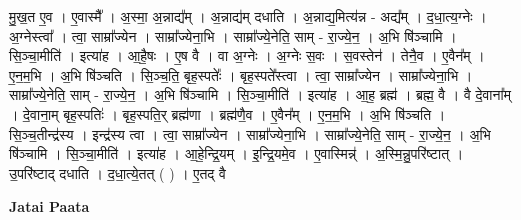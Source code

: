\documentclass[17pt]{extarticle}
\begin{document}
मु॒ख॒त ए॒व । ए॒वास्मै᳚ । अ॒स्मा॒ अ॒न्नाद्य᳚म् । अ॒न्नाद्य॑म् दधाति । अ॒न्नाद्य॒मित्य॑न्न - अद्य᳚म् । द॒धा॒त्य॒ग्नेः । अ॒ग्नेस्त्वा᳚ । त्वा॒ साम्रा᳚ज्येन । साम्रा᳚ज्येना॒भि । साम्रा᳚ज्ये॒नेति॒ साम् - रा॒ज्ये॒न॒ । अ॒भि षि॑ञ्चामि । सि॒ञ्चा॒मीति॑ । इत्या॑ह । आ॒है॒षः । ए॒ष वै । वा अ॒ग्नेः । अ॒ग्नेः स॒वः । स॒वस्तेन॑ । तेनै॒व । ए॒वैन᳚म् । ए॒न॒म॒भि । अ॒भि षि॑ञ्चति । सि॒ञ्च॒ति॒ बृह॒स्पतेः᳚ । बृह॒स्पते᳚स्त्वा । त्वा॒ साम्रा᳚ज्येन । साम्रा᳚ज्येना॒भि । साम्रा᳚ज्ये॒नेति॒ साम् - रा॒ज्ये॒न॒ । अ॒भि षि॑ञ्चामि । सि॒ञ्चा॒मीति॑ । इत्या॑ह । आ॒ह॒ ब्रह्म॑ । ब्रह्म॒ वै । वै दे॒वाना᳚म् । दे॒वाना॒म् बृह॒स्पतिः॑ । बृह॒स्पति॒र् ब्रह्म॑णा । ब्रह्म॑णै॒व । ए॒वैन᳚म् । ए॒न॒म॒भि । अ॒भि षि॑ञ्चति । सि॒ञ्च॒तीन्द्र॑स्य । इन्द्र॑स्य त्वा । त्वा॒ साम्रा᳚ज्येन । साम्रा᳚ज्येना॒भि । साम्रा᳚ज्ये॒नेति॒ साम् - रा॒ज्ये॒न॒ । अ॒भि षि॑ञ्चामि । सि॒ञ्चा॒मीति॑ । इत्या॑ह । आ॒हे॒न्द्रि॒यम् । इ॒न्द्रि॒यमे॒व । ए॒वास्मिन्न्॑ । अ॒स्मि॒न्नु॒परि॑ष्टात् । उ॒परि॑ष्टाद् दधाति । द॒धा॒त्ये॒तत् ( ) । ए॒तद् वै \newline

\textbf{Jatai Paata} \newline
\end{document}
